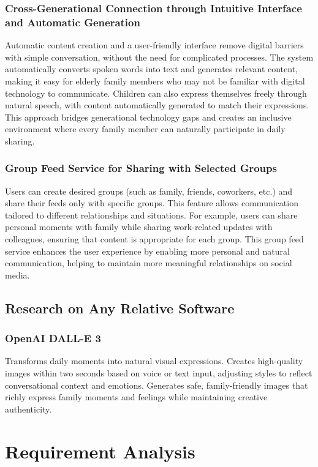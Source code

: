         \subsubsection{Cross-Generational Connection through Intuitive Interface and Automatic Generation}
        Automatic content creation and a user-friendly interface remove digital barriers with simple conversation, without the need for complicated processes. The system automatically converts spoken words into text and generates relevant content, making it easy for elderly family members who may not be familiar with digital technology to communicate. Children can also express themselves freely through natural speech, with content automatically generated to match their expressions. This approach bridges generational technology gaps and creates an inclusive environment where every family member can naturally participate in daily sharing.

        \subsubsection{Group Feed Service for Sharing with Selected Groups}
        Users can create desired groups (such as family, friends, coworkers, etc.) and share their feeds only with specific groups. This feature allows communication tailored to different relationships and situations. For example, users can share personal moments with family while sharing work-related updates with colleagues, ensuring that content is appropriate for each group. This group feed service enhances the user experience by enabling more personal and natural communication, helping to maintain more meaningful relationships on social media.

    \subsection{Research on Any Relative Software}
        \subsubsection{OpenAI DALL-E 3}
        Transforms daily moments into natural visual expressions. Creates high-quality images within two seconds based on voice or text input, adjusting styles to reflect conversational context and emotions. Generates safe, family-friendly images that richly express family moments and feelings while maintaining creative authenticity.

\section{Requirement Analysis}
